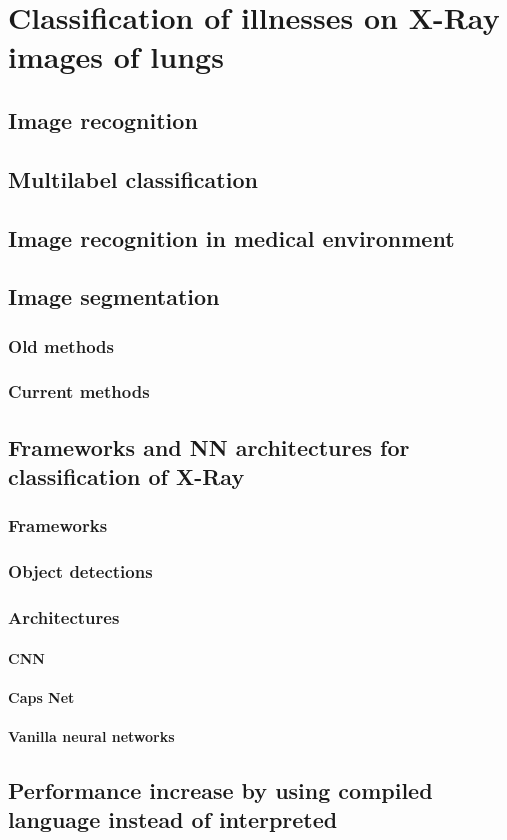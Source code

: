 \chapter{Classification of illnesses on X-Ray images of lungs}

\section{Image recognition}
\section{Multilabel classification}
\section{Image recognition in medical environment}
\section{Image segmentation}
    \subsection{Old methods}
    \subsection{Current methods}
\section{Frameworks and NN architectures for classification of X-Ray}
    \subsection{Frameworks}
    \subsection{Object detections}
    \subsection{Architectures}
        \subsubsection{CNN}
        \subsubsection{Caps Net}
        \subsubsection{Vanilla neural networks}
\section{Performance increase by using compiled language instead of interpreted}